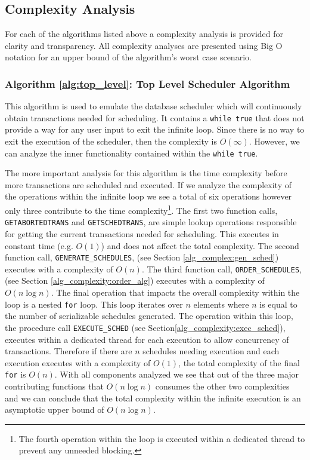 \documentclass[conference]{IEEEtran}
\begin{document}
\subsection{Complexity Analysis}
For each of the algorithms listed above a complexity analysis is provided for clarity and transparency. All complexity analyses are presented using Big O notation for an upper bound of the algorithm's worst case scenario.

\subsubsection{Algorithm \ref{alg:top_level}: Top Level Scheduler Algorithm}
This algorithm is used to emulate the database scheduler which will continuously obtain transactions needed for scheduling. It contains a \verb|while true| that does not provide a way for any user input to exit the infinite loop. Since there is no way to exit the execution of the scheduler, then the complexity is $O(\infty)$. However, we can analyze the inner functionality contained within the \verb|while true|.

The more important analysis for this algorithm is the time complexity before more transactions are scheduled and executed. If we analyze the complexity of the operations within the infinite loop we see a total of six operations however only three contribute to the time complexity\footnote{The fourth operation within the loop is executed within a dedicated thread to prevent any unneeded blocking.}. The first two function calls, \verb|GETABORTEDTRANS| and \verb|GETSCHEDTRANS|, are simple lookup operations responsible for getting the current transactions needed for scheduling. This executes in constant time (e.g. $O(1)$) and does not affect the total complexity. The second function call, \verb|GENERATE_SCHEDULES|, (see Section \ref{alg_complex:gen_sched}) executes with a complexity of $O(n)$. The third function call, \verb|ORDER_SCHEDULES|, (see Section \ref{alg_complexity:order_alg}) executes with a complexity of $O(n\log n)$. The final operation that impacts the overall complexity within the loop is a nested \verb|for| loop. This loop iterates over $n$ elements where $n$ is equal to the number of serializable schedules generated. The operation within this loop, the procedure call \verb|EXECUTE_SCHED| (see Section\ref{alg_complexity:exec_sched}), executes within a dedicated thread for each execution to allow concurrency of transactions. Therefore if there are $n$ schedules needing execution and each execution executes with a complexity of $O(1)$, the total complexity of the final \verb|for| is $O(n)$. With all components analyzed we see that out of the three major contributing functions that $O(n\log n)$ consumes the other two complexities and we can conclude that the total complexity within the infinite execution is an asymptotic upper bound of $O(n\log n)$.
\end{document}
